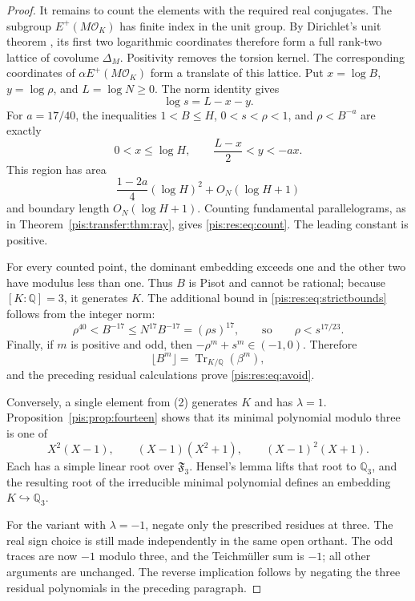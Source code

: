\documentclass[11pt,a4paper]{article}
\theoremstyle{definition}\newtheorem{definition}[theorem]{Definition}
\theoremstyle{remark}\newtheorem{remark}[theorem]{Remark}
\newcommand{\F}{\mathfrak F}\newcommand{\FF}{\mathbb F}
\newcommand{\Q}{\mathbb Q}\newcommand{\R}{\mathbb R}
\newcommand{\Tr}{\operatorname{Tr}}\newcommand{\Nm}{\operatorname{N}}
\begin{document}
\begin{proof}
It remains to count the elements with the required real conjugates.
The subgroup $E^+(M\mathcal O_K)$ has finite index in the unit
group. By Dirichlet's unit theorem \cite[Chapter~5]{MilneANT},
its first two logarithmic coordinates therefore form a full
rank-two lattice of covolume $\Delta_M$. Positivity removes the
torsion kernel. The corresponding coordinates of
$\alpha E^+(M\mathcal O_K)$ form a translate of this lattice.
Put $x=\log B$, $y=\log\rho$, and $L=\log N\ge0$.
The norm identity gives
\[
 \log s=L-x-y.
\]
For $a=17/40$, the inequalities
$1<B\le H$, $0<s<\rho<1$, and $\rho<B^{-a}$ are exactly
\begin{equation}
\label{pis:res:eq:triangle}
 0<x\le\log H,\qquad \frac{L-x}{2}<y<-ax.
\end{equation}
This region has area
\[
 \frac{1-2a}{4}(\log H)^2+O_N(\log H+1)
\]
and boundary length $O_N(\log H+1)$. Counting fundamental
parallelograms, as in Theorem~\ref{pis:transfer:thm:ray}, gives
\eqref{pis:res:eq:count}. The leading constant is positive.

For every counted point, the dominant embedding exceeds one and
the other two have modulus less than one. Thus $B$ is Pisot and
cannot be rational; because $[K:\Q]=3$, it generates $K$.
The additional bound in \eqref{pis:res:eq:strictbounds} follows from
the integer norm:
\[
 \rho^{40}<B^{-17}\le N^{17}B^{-17}
     =(\rho s)^{17},
 \qquad\text{so}\qquad \rho<s^{17/23}.
\]
Finally, if $m$ is positive and odd, then
$-\rho^m+s^m\in(-1,0)$. Therefore
\[
 \lfloor B^m\rfloor=\Tr_{K/\Q}(\beta^m),
\]
and the preceding residual calculations prove \eqref{pis:res:eq:avoid}.

Conversely, a single element from (2) generates $K$ and has
$\lambda=1$. Proposition~\ref{pis:prop:fourteen} shows that its
minimal polynomial modulo three is one of
\[
 X^2(X-1),\qquad (X-1)(X^2+1),\qquad (X-1)^2(X+1).
\]
Each has a simple linear root over $\F_3$. Hensel's lemma lifts
that root to $\Q_3$, and the resulting root of the irreducible
minimal polynomial defines an embedding $K\hookrightarrow\Q_3$.

For the variant with $\lambda=-1$, negate only the prescribed
residues at three. The real sign choice is still made independently
in the same open orthant. The odd traces are now $-1$ modulo three,
and the Teichm\"uller sum is $-1$; all other arguments are unchanged.
The reverse implication follows by negating the three residual
polynomials in the preceding paragraph.
\end{proof}
\end{document}
